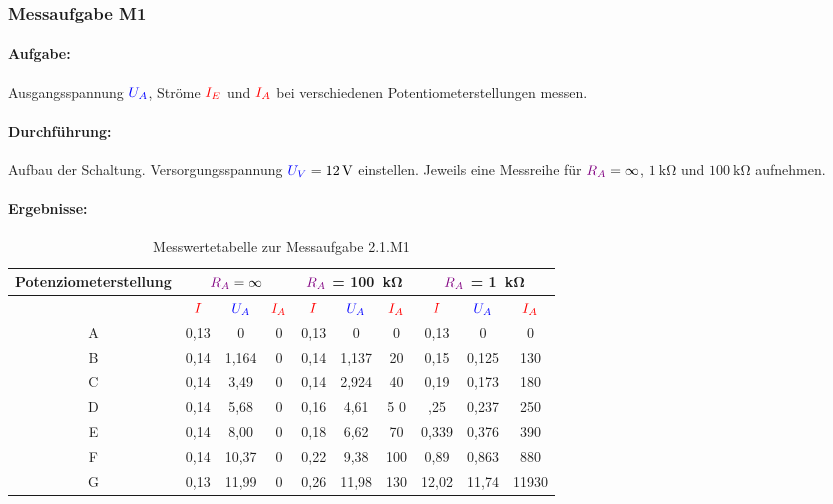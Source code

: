 \documentclass[a4paper,titlepage,parskip]{scrreprt}
\newcommand{\spannung}[1]{\textcolor{blue}{#1}}
\newcommand{\strom}[1]{\textcolor{red}{#1}}
\newcommand{\widerstand}[1]{\textcolor{violet}{#1}}
\begin{document}
        \subsubsection{Messaufgabe M1}
          \paragraph{Aufgabe:} Ausgangsspannung $\spannung{U_A}$, Ströme $\strom{I_E}$ und $\strom{I_A}$ bei verschiedenen Potentiometerstellungen
          messen.
          \paragraph{Durchführung:}Aufbau der Schaltung. Versorgungsspannung $\spannung{U_V} = \SI{12}{\volt}$ einstellen. Jeweils eine
          Messreihe für $\widerstand{R_A} = \infty$, $\SI{1}{\kilo\ohm}$ und $\SI{100}{\kilo\ohm}$ aufnehmen.
          \paragraph{Ergebnisse:}
            \begin{center}
              \begin{table}[!hbtp]
                \caption{Messwertetabelle zur Messaufgabe 2.1.M1}
                \label{tbl:messergebnisse1.1}
                \renewcommand{\arraystretch}{1.3}
                \begin{tabular}{c|ccc|ccc|ccc}
                  Potenziometerstellung & \multicolumn{3}{c}{\textbf{$\widerstand{R_A} = \infty$}} & \multicolumn{3}{c}{\textbf{$\widerstand{R_A}$ = \SI{100}{\kilo\ohm}}}& \multicolumn{3}{c}{\textbf{$\widerstand{R_A}$ = \SI{1}{\kilo\ohm}}}\\ \hline
                                & $\strom{I}$ & $\spannung{U_A}$ & $\strom{I_A}$ & $\strom{I}$ & $\spannung{U_A}$ & $\strom{I_A}$ & $\strom{I}$ & $\spannung{U_A}$ & $\strom{I_A}$\\
                                A & 0,13 & 0 & 0 & 0,13 & 0 & 0 & 0,13 & 0 & 0\\
                                B & 0,14 & 1,164 & 0 & 0,14 & 1,137 & 20 & 0,15 & 0,125 & 130\\
                                C & 0,14 & 3,49 & 0 & 0,14 & 2,924 & 40 & 0,19 & 0,173 & 180\\
                                D & 0,14 & 5,68 & 0 & 0,16 & 4,61 &5 0 & ,25 & 0,237 & 250\\
                                E & 0,14 & 8,00 & 0 & 0,18 & 6,62 & 70 & 0,339 & 0,376 & 390\\
                                F & 0,14 & 10,37 & 0 & 0,22 & 9,38 & 100 & 0,89 & 0,863 & 880\\
                                G & 0,13 & 11,99 & 0 & 0,26 & 11,98 & 130 & 12,02 & 11,74 & 11930\\
                \end{tabular}
              \end{table}
            \end{center}
\end{document}
